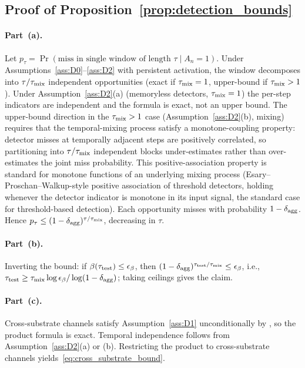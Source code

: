 \subsection{Proof of Proposition~\ref{prop:detection_bounds}}

\paragraph{Part~(a).}
Let $p_\tau = \Pr(\text{miss in single window of length } \tau
\mid A_n = 1)$.  Under Assumptions~\ref{ass:D0}--\ref{ass:D2}
with persistent activation, the window decomposes into
$\tau / \tau_{\mathrm{mix}}$ independent opportunities (exact if
$\tau_{\mathrm{mix}} = 1$, upper-bound if $\tau_{\mathrm{mix}} > 1$).  Under
Assumption~\ref{ass:D2}(a) (memoryless detectors, $\tau_{\mathrm{mix}} = 1$)
the per-step indicators are independent and the formula is
exact, not an upper bound.  The upper-bound direction in the
$\tau_{\mathrm{mix}} > 1$ case
(Assumption~\ref{ass:D2}(b), mixing) requires that the
temporal-mixing process satisfy a monotone-coupling property:
detector misses at temporally adjacent steps are positively
correlated, so partitioning into $\tau/\tau_{\mathrm{mix}}$ independent
blocks under-estimates rather than over-estimates the joint
miss probability.  This positive-association property is
standard for monotone functions of an underlying mixing process
(Esary--Proschan--Walkup-style positive association of
threshold detectors, holding whenever the detector indicator is
monotone in its input signal, the standard case for
threshold-based detection).  Each opportunity misses with
probability $1 - \delta_{\mathrm{agg}}$.  Hence
$p_\tau \leq (1 - \delta_{\mathrm{agg}})^{\tau/\tau_{\mathrm{mix}}}$, decreasing in
$\tau$.

\paragraph{Part~(b).}
Inverting the bound: if $\beta(\tau_{\mathrm{test}}) \leq \epsilon_\beta$,
then $(1 - \delta_{\mathrm{agg}})^{\tau_{\mathrm{test}}/\tau_{\mathrm{mix}}} \leq \epsilon_\beta$,
i.e., $\tau_{\mathrm{test}} \geq \tau_{\mathrm{mix}} \log \epsilon_\beta / \log(1 -
\delta_{\mathrm{agg}})$; taking ceilings gives the claim.

\paragraph{Part~(c).}
Cross-substrate channels satisfy
Assumption~\ref{ass:D1} unconditionally by
\citep[Proposition~5]{lasser2026exo}, so the product formula
is exact.  Temporal independence follows from
Assumption~\ref{ass:D2}(a) or (b).  Restricting the product
to cross-substrate channels yields~\eqref{eq:cross_substrate_bound}.

